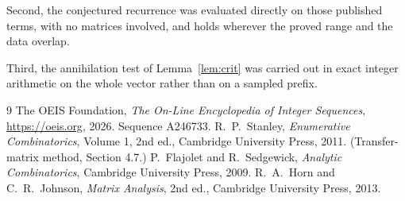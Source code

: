 \documentclass[11pt,a4paper]{article}
\theoremstyle{plain}
\theoremstyle{definition}
\begin{document}
Second, the conjectured recurrence was evaluated directly on those published terms, with no
matrices involved, and holds wherever the proved range and the data overlap.

Third, the annihilation test of Lemma~\ref{lem:crit} was carried out in exact integer
arithmetic on the whole vector rather than on a sampled prefix.

\begin{thebibliography}{9}
 The OEIS Foundation, \emph{The On-Line Encyclopedia of Integer
Sequences}, \url{https://oeis.org}, 2026. Sequence A246733.
 R.~P.~Stanley, \emph{Enumerative Combinatorics}, Volume 1, 2nd ed.,
Cambridge University Press, 2011. (Transfer-matrix method, Section 4.7.)
 P.~Flajolet and R.~Sedgewick, \emph{Analytic Combinatorics}, Cambridge
University Press, 2009.
 R.~A.~Horn and C.~R.~Johnson, \emph{Matrix Analysis}, 2nd ed., Cambridge
University Press, 2013.
\end{thebibliography}
\end{document}
